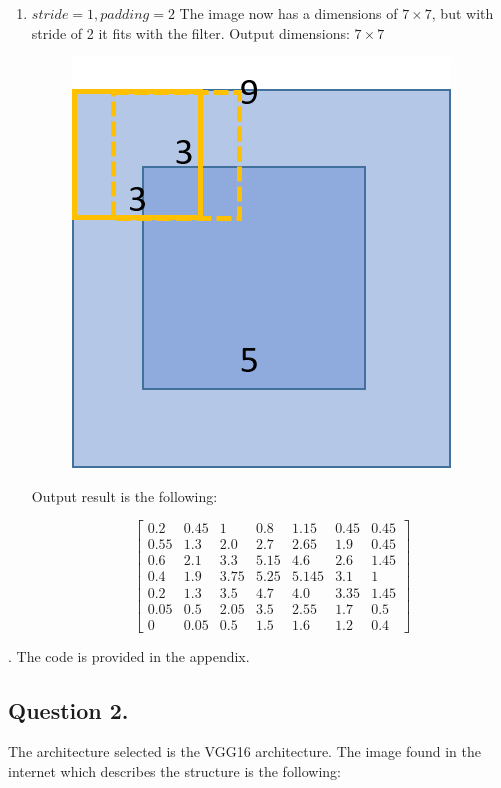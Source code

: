\documentclass[a4paper]{iacas}
\begin{document}
\begin{enumerate}
\item $stride = 1, padding = 2$
The image now has a dimensions of $7\times7$, but with stride of 2 it fits with the filter. Output dimensions: $7\times7$
\vskip 0.1in
\begin{figure}
	\includegraphics[scale=0.8]{imgs/q_1_32.png}
\end{figure}
\vskip 0.1in

Output result is the following:

\begin{equation*}
\left[
\begin{matrix}
0.2 & 0.45 & 1 & 0.8 & 1.15 & 0.45 & 0.45 \\
0.55 & 1.3 & 2.0 & 2.7 & 2.65 & 1.9 & 0.45 \\
0.6 & 2.1 & 3.3 & 5.15 & 4.6 & 2.6 & 1.45\\
0.4 & 1.9 & 3.75 & 5.25 & 5.145 & 3.1 & 1 \\
0.2 & 1.3 & 3.5 & 4.7 & 4.0 & 3.35 & 1.45\\
0.05 & 0.5 & 2.05 & 3.5 & 2.55 & 1.7 & 0.5 \\ 
0 & 0.05 & 0.5 & 1.5 & 1.6 & 1.2 & 0.4
\end{matrix}
\right]
\end{equation*}
\end{enumerate}.
The code is provided in the appendix.


\newpage
\subsection{Question 2.}
The architecture selected is the VGG16 architecture. The image found in the internet which describes the structure is the following:
\end{document}
